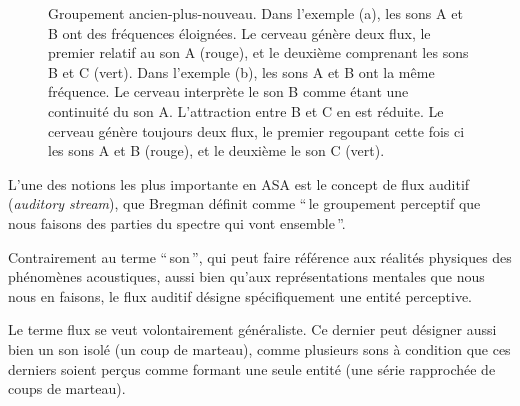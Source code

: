 \begin{figure}[bth]
        \myfloatalign
        \caption[Groupement ancien-plus-nouveau]{Groupement ancien-plus-nouveau. Dans l'exemple (a), les sons A et B ont des fréquences éloignées. Le cerveau génère deux flux, le premier relatif au son A (rouge), et le deuxième comprenant les sons B et C (vert). Dans l'exemple (b), les sons A et B ont la même fréquence. Le cerveau interprète le son B comme étant une continuité du son A. L'attraction entre B et C en est réduite. Le cerveau génère toujours deux flux, le premier regoupant cette fois ci les sons A et B (rouge), et le deuxième le son C (vert).}\label{fig:oldplusnew}
\end{figure}

L'une des notions les plus importante en ASA est le concept de flux auditif (\emph{auditory stream}), que Bregman définit comme ``\,le groupement perceptif que nous faisons des parties du spectre qui vont ensemble\,''.

Contrairement au terme ``\,son\,'', qui peut faire référence aux réalités physiques des phénomènes acoustiques, aussi bien qu'aux représentations mentales que nous nous en faisons, le flux auditif désigne spécifiquement une entité perceptive.

Le terme flux se veut volontairement généraliste. Ce dernier peut désigner aussi bien un son isolé (un coup de marteau), comme plusieurs sons à condition que ces derniers soient perçus comme formant une seule entité (une série rapprochée de coups de marteau).

